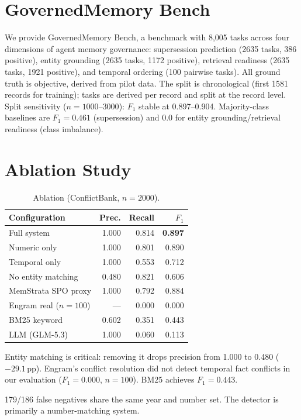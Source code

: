 \documentclass{llncs}
\begin{document}
\section{GovernedMemory Bench}


We provide GovernedMemory Bench, a benchmark with 8{,}005 tasks across four dimensions of agent memory governance: supersession prediction (2{}635 tasks, 386 positive), entity grounding (2{}635 tasks, 1{}172 positive), retrieval readiness (2{}635 tasks, 1{}921 positive), and temporal ordering (100 pairwise tasks). All ground truth is objective, derived from pilot data. The split is chronological (first 1{}581 records for training); tasks are derived per record and split at the record level. Split sensitivity ($n{=}1000$--$3000$): $F_1$ stable at 0.897--0.904. Majority-class baselines are $F_1{=}0.461$ (supersession) and 0.0 for entity grounding/retrieval readiness (class imbalance).

\section{Ablation Study}

\begin{table}[h]
\centering
\caption{Ablation (ConflictBank, $n{=}2{}000$).}
\begin{tabular}{lrrr}
\toprule
Configuration & Prec. & Recall & $F_1$ \\
\midrule
Full system & 1.000 & 0.814 & \textbf{0.897} \\
Numeric only & 1.000 & 0.801 & 0.890 \\
Temporal only & 1.000 & 0.553 & 0.712 \\
No entity matching & 0.480 & 0.821 & 0.606 \\
MemStrata SPO proxy & 1.000 & 0.792 & 0.884 \\
Engram real ($n{=}100$) & --- & 0.000 & 0.000 \\
BM25 keyword & 0.602 & 0.351 & 0.443 \\
LLM (GLM-5.3) & 1.000 & 0.060 & 0.113 \\
\bottomrule
\end{tabular}
\end{table}

Entity matching is critical: removing it drops precision from 1.000 to 0.480 ($-29.1$\,pp). Engram's conflict resolution did not detect temporal fact conflicts in our evaluation ($F_1{=}0.000$, $n{=}100$). BM25 achieves $F_1{=}0.443$.

179/186 false negatives share the same year and number set. The detector is primarily a number-matching system.
\end{document}
